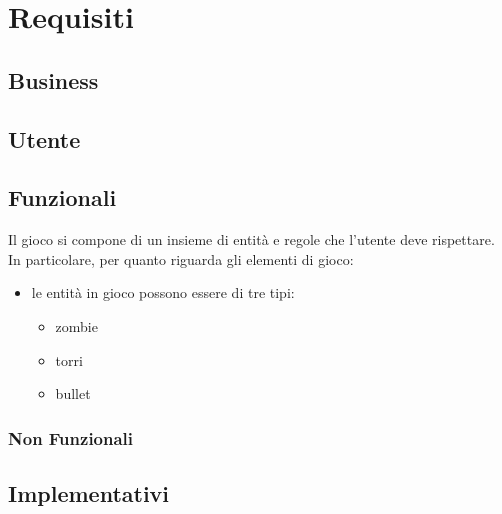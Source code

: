 
\section{Requisiti}

\subsection{Business}

\subsection{Utente}

\subsection{Funzionali}
Il gioco si compone di un insieme di entità e regole che l'utente deve rispettare. In particolare, per quanto riguarda gli elementi di gioco:
\begin{itemize}
    \item le entità in gioco possono essere di tre tipi:
    \begin{itemize}
        \item zombie
        \item torri
        \item bullet
    \end{itemize}
\end{itemize}

\subsubsection{Non Funzionali}

\subsection{Implementativi}